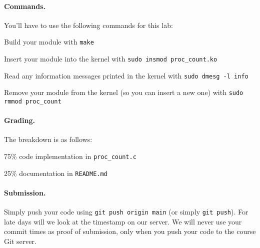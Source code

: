 \paragraph{Commands.}

You'll have to use the following commands for this lab:

Build your module with \lstinline|make|

Insert your module into the kernel with \lstinline|sudo insmod proc_count.ko|

Read any information messages printed in the kernel with
\lstinline|sudo dmesg -l info|

Remove your module from the kernel (so you can insert a new one) with
\lstinline|sudo rmmod proc_count|

\paragraph{Grading.}

The breakdown is as follows:

75\% \hspace{0.5em} code implementation in \lstinline|proc_count.c|

25\% \hspace{0.5em} documentation in \lstinline|README.md|

\paragraph{Submission.}

Simply push your code using \lstinline|git push origin main| (or simply
\lstinline|git push|).
For late days will we look at the timestamp on our server.
We will never use your commit times as proof of submission, only when you
push your code to the course Git server.


